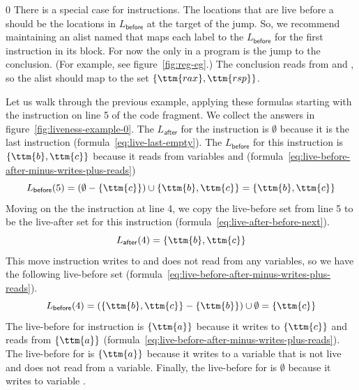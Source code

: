 \documentclass[7x10]{TimesAPriori_MIT}%
\def\racketEd{0}
\def\edition{0}
\numberwithin{theorem}{chapter}
\numberwithin{definition}{chapter}
\numberwithin{equation}{chapter}
\begin{document}
{\if\edition\racketEd
%
There is a special case for  instructions.  The locations
that are live before a  should be the locations in
$L_{\mathsf{before}}$ at the target of the jump. So, we recommend
maintaining an alist named  that maps each label to
the $L_{\mathsf{before}}$ for the first instruction in its block. For
now the only  in a \LangXVar{} program is the jump to the
conclusion. (For example, see figure~\ref{fig:reg-eg}.)  The
conclusion reads from  and , so the alist should map
 to the set $\{\ttm{rax},\ttm{rsp}\}$.
%
\fi}

Let us walk through the previous example, applying these formulas
starting with the instruction on line 5 of the code fragment. We
collect the answers in figure~\ref{fig:liveness-example-0}.  The
$L_{\mathsf{after}}$ for the  instruction is
$\emptyset$ because it is the last instruction
(formula~\eqref{eq:live-last-empty}).  The $L_{\mathsf{before}}$ for
this instruction is $\{\ttm{b},\ttm{c}\}$ because it reads from
variables  and 
(formula~\eqref{eq:live-before-after-minus-writes-plus-reads})
\[
   L_{\mathsf{before}}(5) = (\emptyset - \{\ttm{c}\}) \cup \{ \ttm{b}, \ttm{c} \} = \{ \ttm{b}, \ttm{c} \}
\]
Moving on the the instruction  at line 4, we copy
the live-before set from line 5 to be the live-after set for this
instruction (formula~\eqref{eq:live-after-before-next}).
\[
  L_{\mathsf{after}}(4) = \{ \ttm{b}, \ttm{c} \}
\]
This move instruction writes to  and does not read from any
variables, so we have the following live-before set
(formula~\eqref{eq:live-before-after-minus-writes-plus-reads}).
\[
  L_{\mathsf{before}}(4) = (\{\ttm{b},\ttm{c}\} - \{\ttm{b}\}) \cup \emptyset = \{ \ttm{c} \}
\]
The live-before for instruction 
is $\{\ttm{a}\}$ because it writes to $\{\ttm{c}\}$ and reads from $\{\ttm{a}\}$
(formula~\eqref{eq:live-before-after-minus-writes-plus-reads}).  The
live-before for  is $\{\ttm{a}\}$ because it writes to a
variable that is not live and does not read from a variable.
Finally, the live-before for  is $\emptyset$
because it writes to variable .
\end{document}

